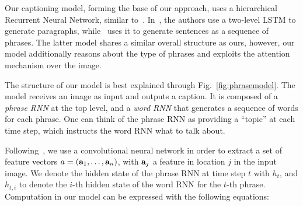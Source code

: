 Our captioning model, forming the base of our approach, uses a hierarchical Recurrent Neural Network, similar to~\cite{Tan16,Krause17}. In~\cite{Krause17}, the authors use a two-level LSTM to generate paragraphs, while~\cite{Tan16} uses it to generate sentences as a sequence of phrases. The latter model shares a similar overall structure as ours, however, our model additionally reasons about the type of phrases and exploits the attention mechanism over the image. 

The structure of our model is best explained through Fig.~\ref{fig:phrasemodel}. The model receives an image as input and outputs a caption. It is composed of a \emph{phrase RNN} at the top level, and a \emph{word RNN} that generates a sequence of words for each phrase. One can think of the phrase RNN as providing a ``topic'' at each time step, which instructs the word RNN what to talk about. 

Following~\cite{Xu15}, we use a convolutional neural network in order to extract a
set of feature vectors ${a}=({\bf a}_1,\dots,{\bf a}_n)$, with ${\bf a}_j$ a feature in location $j$ in the input image. We denote the hidden state of the phrase RNN at time step $t$ with $h_t$, and $h_{t,i}$ to denote the $i$-th hidden state of the word RNN for the $t$-th phrase. Computation in our model can be expressed with the following equations: 

